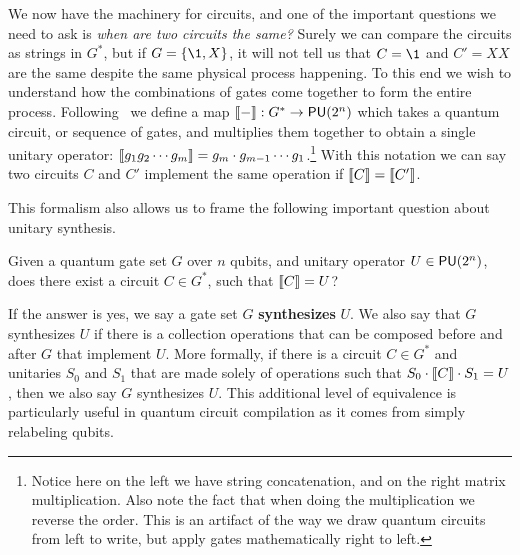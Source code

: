 We now have the machinery for circuits, and one of the important questions we need to ask is \emph{when are two circuits the same?}
Surely we can compare the circuits as strings in $G^*$, but if $G = \qty{\1, X}$, it will not tell us that $C = \1$ and $C' = XX$ are the same despite the same physical process happening.
To this end we wish to understand how the combinations of gates come together to form the entire process.
Following~\cite{formalcircuit} we define a map $\llbracket-\rrbracket: G^* \to \mathsf{PU} (2^n)$ which takes a quantum circuit, or sequence of gates, and multiplies them together to obtain a single unitary operator: $\llbracket g_1g_2\cdots g_m\rrbracket = g_m\cdot g_{m-1} \cdots g_1$.\footnote{Notice here on the left we have string concatenation, and on the right matrix multiplication. Also note the fact that when doing the multiplication we reverse the order. This is an artifact of the way we draw quantum circuits from left to write, but apply gates mathematically right to left.}
With this notation we can say two circuits $C$ and $C'$ implement the same operation if $\llbracket C\rrbracket = \llbracket C'\rrbracket$.

This formalism also allows us to frame the following important question about unitary synthesis.
\begin{question}\label{qu:synthesis}
    Given a quantum gate set $G$ over $n$ qubits, and unitary operator $U \in \mathsf{PU} (2^n)$, does there exist a circuit $C\in G^*$, such that $\llbracket C\rrbracket = U$?
\end{question}
If the answer is yes, we say a gate set $G$ \textbf{synthesizes} $U$.
We also say that $G$ synthesizes $U$ if there is a collection \SWAP{} operations that can be composed before and after $G$ that implement $U$.
More formally, if there is a circuit $C \in G^*$ and unitaries $S_0$ and $S_1$ that are made solely of \SWAP{} operations such that $S_0 \cdot \llbracket C\rrbracket \cdot S_1 = U$, then we also say $G$ synthesizes $U$.
This additional level of equivalence is particularly useful in quantum circuit compilation as it comes from simply relabeling qubits.

